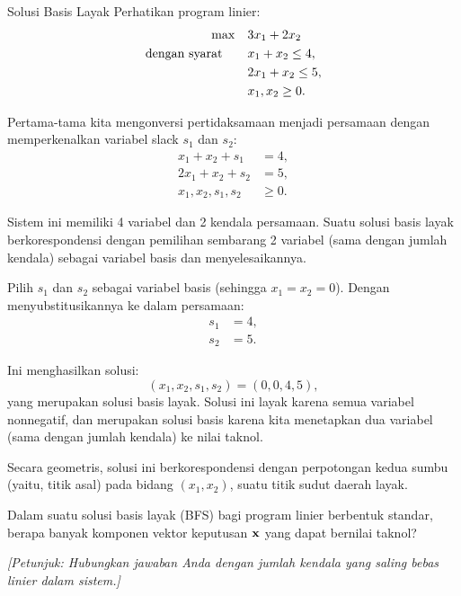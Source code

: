 \begin{example}{Solusi Basis Layak}\label{exa:bfs-2d-example}
Perhatikan program linier:
\[
\begin{aligned}
\max \quad & 3x_1 + 2x_2 \\
\mbox{dengan syarat}\quad \quad
& x_1 + x_2 \leq 4, \\
& 2x_1 + x_2 \leq 5, \\
& x_1, x_2 \geq 0.
\end{aligned}
\]

Pertama-tama kita mengonversi pertidaksamaan menjadi persamaan dengan memperkenalkan variabel slack \( s_1 \) dan \( s_2 \):
\[
\begin{aligned}
x_1 + x_2 + s_1 &= 4, \\
2x_1 + x_2 + s_2 &= 5, \\
x_1, x_2, s_1, s_2 &\geq 0.
\end{aligned}
\]

Sistem ini memiliki 4 variabel dan 2 kendala persamaan. Suatu solusi basis layak berkorespondensi dengan pemilihan sembarang 2 variabel (sama dengan jumlah kendala) sebagai variabel basis dan menyelesaikannya.

Pilih \( s_1 \) dan \( s_2 \) sebagai variabel basis (sehingga \( x_1 = x_2 = 0 \)). Dengan menyubstitusikannya ke dalam persamaan:
\[
\begin{aligned}
s_1 &= 4, \\
s_2 &= 5.
\end{aligned}
\]

Ini menghasilkan solusi:
\[
(x_1, x_2, s_1, s_2) = (0, 0, 4, 5),
\]
yang merupakan solusi basis layak. Solusi ini layak karena semua variabel nonnegatif, dan merupakan solusi basis karena kita menetapkan dua variabel (sama dengan jumlah kendala) ke nilai taknol.

\smallskip

Secara geometris, solusi ini berkorespondensi dengan perpotongan kedua sumbu (yaitu, titik asal) pada bidang \( (x_1, x_2) \), suatu titik sudut daerah layak.
\end{example}

\begin{learningcheckpoint}[label={lc:bfs-nonzero}]
Dalam suatu solusi basis layak (BFS) bagi program linier berbentuk standar, berapa banyak komponen vektor keputusan \(\mathbf{x}\) yang dapat bernilai taknol?

\emph{[Petunjuk: Hubungkan jawaban Anda dengan jumlah kendala yang saling bebas linier dalam sistem.]}
\end{learningcheckpoint}


